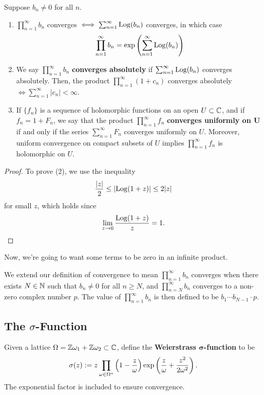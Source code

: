 \documentclass[11pt]{article}
\begin{document}
\begin{prop}
Suppose $b_n \neq 0$ for all $n$.
    \begin{enumerate}
    \item $\prod_{n=1}^\infty b_n$ converges $\iff \sum_{n=1}^\infty \operatorname{Log}(b_n)$ converges, in which case
    $$\prod_{n=1}^\infty b_n = \exp\left ( \sum_{n=1}^\infty \operatorname{Log}(b_n) \right )$$
    \item We say $\prod_{n=1}^\infty b_n$ \textbf{converges absolutely} if $\sum_{n=1}^\infty \operatorname{Log}(b_n)$ converges absolutely. Then, the product $\prod_{n=1}^\infty (1+c_n)$ converges absolutely $\iff \sum_{n=1}^\infty |c_n| < \infty$.
    \item If $\{f_n\}$ is a sequence of holomorphic functions on an open $U \subset \mathbb{C}$, and if $f_n = 1+F_n$, we say that the product $\prod_{n=1}^\infty f_n$ \textbf{converges uniformly on $\bm U$} if and only if the series $\sum_{n=1}^\infty F_n$ converges uniformly on $U$. Moreover, uniform convergence on compact subsets of $U$ implies $\prod_{n=1}^\infty f_n$ is holomorphic on $U$.
\end{enumerate}
\end{prop}

\begin{proof}
    To prove (2), we use the inequality
    $$\frac{|z|}{2}\leq \left | \operatorname{Log}(1+z) \right |\leq 2|z|$$
    for small $z$, which holds since
    $$\lim_{z \to 0}\frac{\operatorname{Log}(1+z)}{z}=1.$$
\end{proof}

Now, we're going to want some terms to be zero in an infinite product. 
\begin{defn}
We extend our definition of convergence to mean $\prod_{n=1}^\infty b_n$ converges when there exists $N \in \mathbb{N}$ such that $b_n \neq 0$ for all $n \geq N$, and $\prod_{n=N}^\infty b_n$ converges to a non-zero complex number $p$. The value of $\prod_{n=1}^\infty b_n$ is then defined to be $b_1\cdots b_{N-1}\cdot p$.    
\end{defn}

\subsection{\texorpdfstring{The $\sigma$-Function}{The sigma-Function}}

\begin{defn}
    Given a lattice $\Omega = \mathbb{Z}\omega_1 + \mathbb{Z}\omega_2 \subset \mathbb{C}$, define the \textbf{Weierstrass $\bm \sigma$-function} to be
    $$\sigma(z):=z\prod_{\omega \in \Omega^*}\left ( 1-\frac{z}{\omega} \right )\exp\left ( \frac{z}{\omega
    }+\frac{z^2}{2\omega^2}  \right ).$$
    The exponential factor is included to ensure convergence.
\end{defn}
\end{document}
